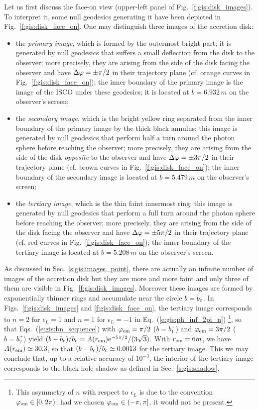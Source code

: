 Let us first discuss the face-on view (upper-left panel of Fig.~\ref{f:gis:disk_images}).
To interpret it, some null geodesics generating it have been depicted
in Fig.~\ref{f:gis:disk_face_on}. One may distinguish three images of the accretion disk:
\begin{itemize}
\item the \emph{primary image}, which is formed by the outermost bright part; it is
generated by null geodesics that suffers a small deflection from the disk to
the observer; more precisely, they are arising from the side of the disk facing
the observer and have
$\Delta\varphi = \pm \pi/2$ in their trajectory plane (cf. orange curves in
Fig.~\ref{f:gis:disk_face_on}); the inner boundary of the
primary image is the image of the ISCO under these geodesics; it is located
at $b = 6.932\, m$ on the observer's screen;
\item the \emph{secondary image}, which is the bright yellow ring separated
from the inner boundary of the primary image by the thick black annulus; this
image is generated by null geodesics that perform half a turn around the
photon sphere before reaching the observer;  more precisely,
they are arising from the side of the disk \emph{opposite} to
the observer and have
$\Delta\varphi = \pm 3\pi/2$ in their trajectory plane (cf. brown curves in
Fig.~\ref{f:gis:disk_face_on}); the inner boundary of the secondary image
is located at $b = 5.479\, m$ on the observer's screen;
\item the \emph{tertiary image}, which is the thin faint innermost ring;
this image is generated by null geodesics that perform a full turn around
the photon sphere before reaching the observer; more precisely,
they are arising from the side of the disk facing
the observer and have
$\Delta\varphi = \pm 5\pi/2$ in their trajectory plane (cf. red curves in
Fig.~\ref{f:gis:disk_face_on}); the inner boundary of the tertiary image
is located at $b = 5.208\, m$ on the observer's screen.
\end{itemize}
As discussed in Sec.~\ref{s:gis:images_point}, there are actually an infinite
number of images of the accretion disk but they are more and more faint and
only three of them are visible in Fig.~\ref{f:gis:disk_images}. Moreover
these images are formed by exponentially thinner rings and accumulate near the circle $b = b_{\rm c}$. In Figs.~\ref{f:gis:disk_images} and \ref{f:gis:disk_face_on}, the tertiary image corresponds
to $n=2$ for $\epsilon_L = 1$ and $n=1$ for $\epsilon_L = -1$
in Eq.~(\ref{e:gis:ph_inf_2pi_n}) \footnote{This asymmetry of $n$ with respect to
$\epsilon_L$ is
due to the convention $\varphi_{\rm em}\in{[0,2\pi)}$;
had we chosen $\varphi_{\rm em}\in{(-\pi, \pi]}$, it would not be present.}, so that Eqs.~(\ref{e:gis:bn_sequence})
with $\varphi_{\rm em} = \pi/2$ ($b = b_1^-$) and $\varphi_{\rm em} = 3\pi/2$ ($b = b_2^+$)
yield $(b - b_{\rm c})/b_{\rm c} = A(r_{\rm em}) \mathrm{e}^{-5\pi/2}/(3\sqrt{3})$. With $r_{\rm em} = 6 m$,
we have $A(r_{\rm em}) \simeq 30.3$, so that $(b - b_{\rm c})/b_{\rm c} \simeq 0.0013$
for the tertiary image. This we may conclude that,  up to a relative accuracy of $10^{-3}$,
the interior of the tertiary image
corresponds to the black hole shadow as defined in Sec.~\ref{s:gis:shadow},

